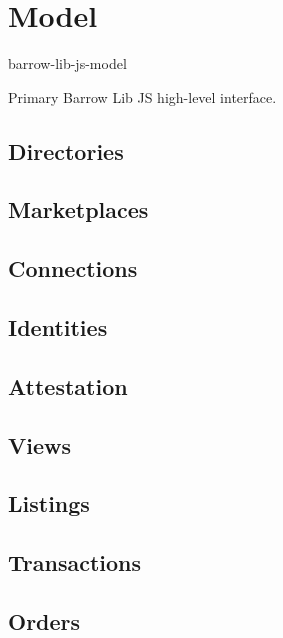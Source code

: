 \section{Model}
barrow-lib-js-model

Primary Barrow Lib JS high-level interface.

\subsection{Directories}

\subsection{Marketplaces}

\subsection{Connections}

\subsection{Identities}

\subsection{Attestation}

\subsection{Views}

\subsection{Listings}

\subsection{Transactions}

\subsection{Orders}

